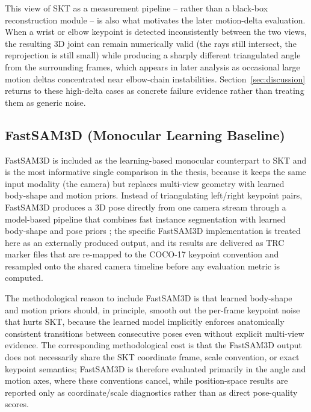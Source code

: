 \documentclass[12pt,a4paper]{article}
\begin{document}
This view of SKT as a measurement pipeline -- rather than a black-box
reconstruction module -- is also what motivates the later motion-delta
evaluation.
When a wrist or elbow keypoint is detected inconsistently between the two
views, the resulting 3D joint can remain numerically valid (the rays still
intersect, the reprojection is still small) while producing a sharply
different triangulated angle from the surrounding frames, which appears in
later analysis as occasional large motion deltas concentrated near
elbow-chain instabilities.
Section~\ref{sec:discussion} returns to these high-delta cases as concrete
failure evidence rather than treating them as generic noise.

\subsection{FastSAM3D (Monocular Learning Baseline)}

FastSAM3D is included as the learning-based monocular counterpart to SKT
and is the most informative single comparison in the thesis, because it
keeps the same input modality (the camera) but replaces multi-view
geometry with learned body-shape and motion priors.
Instead of triangulating left/right keypoint pairs, FastSAM3D produces a
3D pose directly from one camera stream through a model-based pipeline
that combines fast instance segmentation with learned body-shape and pose
priors \cite{yang2026fastsam3d}; the specific FastSAM3D
implementation is treated here as an externally produced output, and its
results are delivered as TRC marker files that are re-mapped to the
COCO-17 keypoint convention and resampled onto the shared camera timeline
before any evaluation metric is computed.

The methodological reason to include FastSAM3D is that learned body-shape
and motion priors should, in principle, smooth out the per-frame keypoint
noise that hurts SKT, because the learned model implicitly enforces
anatomically consistent transitions between consecutive poses even without
explicit multi-view evidence.
The corresponding methodological cost is that the FastSAM3D output does
not necessarily share the SKT coordinate frame, scale convention, or
exact keypoint semantics; FastSAM3D is therefore evaluated primarily in
the angle and motion axes, where these conventions cancel, while
position-space results are reported only as coordinate/scale diagnostics
rather than as direct pose-quality scores.

\clearpage
\end{document}
